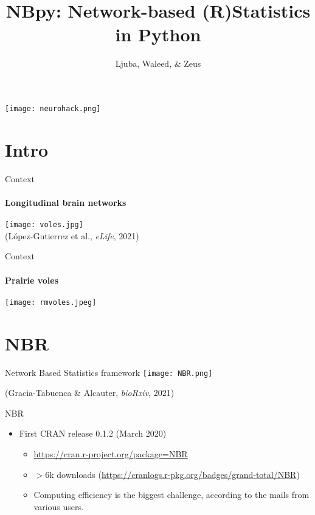 \documentclass[english,aspectratio=169]{beamer}
\title[NBpy]{NBpy: Network-based (R)Statistics in Python}
\author[]{Ljuba, Waleed, \& Zeus}
\begin{document}
\begin{frame}%
  \titlepage

  \centering
  \vspace*{-0.5cm}
  \texttt{[image: neurohack.png]}
\end{frame}

\section{Intro}

\begin{frame}{Context}%
  \framesubtitle{Longitudinal brain networks}

  \centering
  \texttt{[image: voles.jpg]}\\[0.25cm]

  \raggedleft
  (López-Gutierrez et al., \textit{eLife}, 2021)

\end{frame}

\begin{frame}{Context}%
  \framesubtitle{Prairie voles}

  \centering
  \texttt{[image: rmvoles.jpeg]}\\[0.25cm]

\end{frame}

\section{NBR}

\begin{frame}{Network Based Statistics framework}%
  \centering
  \texttt{[image: NBR.png]}\\[0.1cm]

  \raggedright
  (Gracia-Tabuenca \& Alcauter, \textit{bioRxiv}, 2021)

\end{frame}

\begin{frame}{NBR}%

  \large
  \begin{itemize}
    \item First CRAN release 0.1.2 (March 2020)
    \begin{itemize}
        \item \url{https://cran.r-project.org/package=NBR}
        \item $>$6k downloads (\url{https://cranlogs.r-pkg.org/badges/grand-total/NBR})
        \item Computing efficiency is the biggest challenge, according to the mails from various users.
    \end{itemize}
  \end{itemize}

\end{frame}
\end{document}
